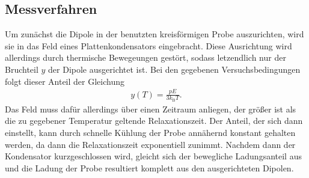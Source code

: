 \subsection{Messverfahren}

Um zunächst die Dipole in der benutzten kreisförmigen Probe auszurichten, wird sie in das Feld eines Plattenkondensators eingebracht. Diese Ausrichtung wird allerdings durch thermische Bewegeungen gestört, sodass letzendlich nur der Bruchteil $y$ der Dipole ausgerichtet ist. Bei den gegebenen Versuchsbedingungen folgt dieser Anteil der Gleichung
\begin{align}
  y(T) = \frac{pE}{3k_\text{B}T}.
\end{align}
Das Feld muss dafür allerdings über einen Zeitraum anliegen, der größer ist als die zu gegebener Temperatur geltende Relaxationszeit.
Der Anteil, der sich dann einstellt, kann durch schnelle Kühlung der Probe annähernd konstant gehalten werden, da dann die Relaxationszeit exponentiell zunimmt. Nachdem dann der Kondensator kurzgeschlossen wird, gleicht sich der bewegliche Ladungsanteil aus und die Ladung der Probe resultiert komplett aus den ausgerichteten Dipolen.

